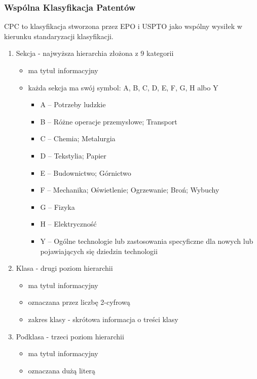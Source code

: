 \subsubsection{Wspólna Klasyfikacja Patentów}

\ac{CPC} to klasyfikacja stworzona przez \ac{EPO} i \ac{USPTO}
jako wspólny wysiłek w kierunku standaryzacji klasyfikacji.

\begin{enumerate}
    \item Sekcja - najwyższa hierarchia złożona z 9 kategorii
    \begin{itemize}
        \item ma tytuł informacyjny
        \item każda sekcja ma swój symbol: A, B, C, D, E, F, G, H albo Y
        \begin{itemize}
            \item A – Potrzeby ludzkie
            \item B – Różne operacje przemysłowe; Transport
            \item C – Chemia; Metalurgia
            \item D – Tekstylia; Papier
            \item E – Budownictwo; Górnictwo
            \item F – Mechanika; Oświetlenie; Ogrzewanie; Broń; Wybuchy
            \item G – Fizyka
            \item H – Elektryczność
            \item Y – Ogólne technologie lub zastosowania specyficzne dla nowych lub pojawiających się dziedzin technologii
        \end{itemize}
    \end{itemize}
    \item Klasa - drugi poziom hierarchii
    \begin{itemize}
        \item ma tytuł informacyjny
        \item oznaczana przez liczbę 2-cyfrową
        \item zakres klasy - skrótowa informacja o treści klasy
    \end{itemize}
    \item Podklasa - trzeci poziom hierarchii
    \begin{itemize}
        \item ma tytuł informacyjny
        \item oznaczana dużą literą

\end{itemize}
\end{enumerate}
